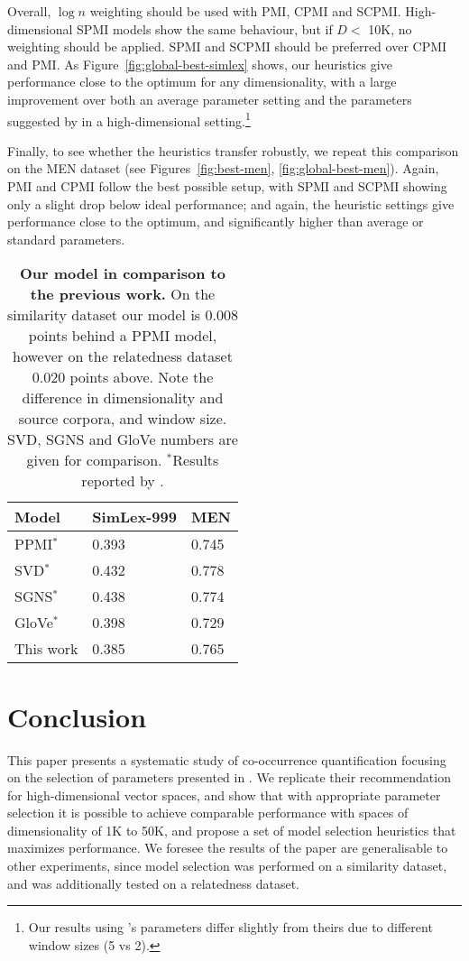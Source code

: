 \documentclass[11pt]{article}
\begin{document}
Overall, $\log n$ weighting should be used with PMI, CPMI and SCPMI. High-dimensional SPMI models show the same behaviour, but if $D<$ 10K, no weighting should be applied. SPMI and SCPMI should be preferred over CPMI and PMI. As Figure~\ref{fig:global-best-simlex} shows, our heuristics give performance close to the optimum for any dimensionality, with a large improvement over both an average parameter setting and the parameters suggested by \cite{TACL570} in a high-dimensional setting.\footnote{Our results using \cite{TACL570}'s parameters differ slightly from theirs due to different window sizes (5 vs 2).}

Finally, to see whether the heuristics transfer robustly, we repeat this comparison on the MEN dataset (see Figures~\ref{fig:best-men}, \ref{fig:global-best-men}). Again, PMI and CPMI follow the best possible setup, with SPMI and SCPMI showing only a slight drop below ideal performance; and again, the heuristic settings give performance close to the optimum, and significantly higher than average or standard parameters.

\begin{table}
  \centering
  \begin{tabular}{lll}
    \toprule
    Model           & SimLex-999 & MEN \\
    \midrule
    PPMI$^*$        & 0.393      & 0.745 \\
    SVD$^*$         & 0.432      & 0.778 \\
    SGNS$^*$        & 0.438      & 0.774 \\
    GloVe$^*$       & 0.398      & 0.729 \\
    \addlinespace
    This work       & 0.385      & 0.765 \\
    \bottomrule
  \end{tabular}
  \caption{\textbf{Our model in comparison to the previous work.} On the similarity dataset our model is 0.008 points behind a PPMI model, however on the relatedness dataset 0.020 points above. Note the difference in dimensionality and source corpora, and window size. SVD, SGNS and GloVe numbers are given for comparison. $^*$Results reported by .}
\label{tab:results}
\end{table}

\section{Conclusion}
\label{sec:conclusion}

This paper presents a systematic study of co-occurrence quantification focusing on the selection of parameters presented in . We replicate their recommendation for high-dimensional vector spaces, and show that with appropriate parameter selection it is possible to achieve comparable performance with spaces of dimensionality of 1K to 50K, and propose a set of model selection heuristics that maximizes performance. We foresee the results of the paper are generalisable to other experiments, since model selection was performed on a similarity dataset, and was additionally tested on a relatedness dataset.
\end{document}
